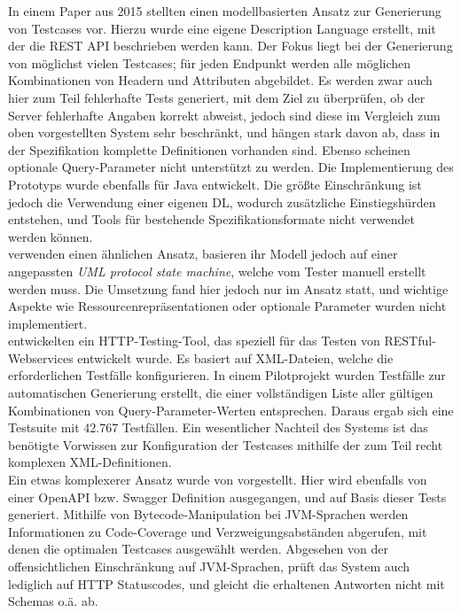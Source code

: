 In einem Paper aus 2015 stellten \textcite{fertig2015model} einen modellbasierten Ansatz zur Generierung von Testcases vor. Hierzu wurde eine eigene Description Language erstellt, mit der die REST API beschrieben werden kann. Der Fokus liegt bei der Generierung von möglichst vielen Testcases; für jeden Endpunkt werden alle möglichen Kombinationen von Headern und Attributen abgebildet. Es werden zwar auch hier zum Teil fehlerhafte Tests generiert, mit dem Ziel zu überprüfen, ob der Server fehlerhafte Angaben korrekt abweist, jedoch sind diese im Vergleich zum oben vorgestellten System sehr beschränkt, und hängen stark davon ab, dass in der Spezifikation komplette Definitionen vorhanden sind. Ebenso scheinen optionale Query-Parameter nicht unterstützt zu werden. Die Implementierung des Prototyps wurde ebenfalls für Java entwickelt. Die größte Einschränkung ist jedoch die Verwendung einer eigenen DL, wodurch zusätzliche Einstiegshürden entstehen, und Tools für bestehende Spezifikationsformate nicht verwendet werden können.\\

\textcite{pinheiro2013model} verwenden einen ähnlichen Ansatz, basieren ihr Modell jedoch auf einer angepassten \emph{UML protocol state machine}, welche vom Tester manuell erstellt werden muss. Die Umsetzung fand hier jedoch nur im Ansatz statt, und wichtige Aspekte wie Ressourcenrepräsentationen oder optionale Parameter wurden nicht implementiert.\\

\textcite{chakrabarti2009test} entwickelten ein HTTP-Testing-Tool, das speziell für das Testen von RESTful-Webservices entwickelt wurde. Es basiert auf XML-Dateien, welche die erforderlichen Testfälle konfigurieren. In einem Pilotprojekt wurden Testfälle zur automatischen Generierung erstellt, die einer vollständigen Liste aller gültigen Kombinationen von Query-Parameter-Werten entsprechen. Daraus ergab sich eine Testsuite mit 42.767 Testfällen. Ein wesentlicher Nachteil des Systems ist das benötigte Vorwissen zur Konfiguration der Testcases mithilfe der zum Teil recht komplexen XML-Definitionen. \\

Ein etwas komplexerer Ansatz wurde von \textcite{arcuri2017restful} vorgestellt. Hier wird ebenfalls von einer OpenAPI bzw. Swagger Definition ausgegangen, und auf Basis dieser Tests generiert. Mithilfe von Bytecode-Manipulation bei JVM-Sprachen werden Informationen zu Code-Coverage und Verzweigungsabständen abgerufen, mit denen die optimalen Testcases ausgewählt werden. Abgesehen von der offensichtlichen Einschränkung auf JVM-Sprachen, prüft das System auch lediglich auf HTTP Statuscodes, und gleicht die erhaltenen Antworten nicht mit Schemas o.ä. ab. \\

